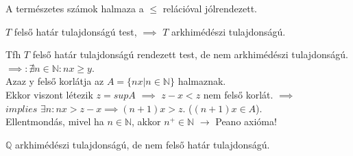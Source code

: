 \begin{frame}

\begin{tcolorbox}[title={Tétel: N rendezése}]
A természetes számok halmaza a $\leq$ relációval jólrendezett.
\end{tcolorbox}

\end{frame}

\begin{frame}

\begin{tcolorbox}[title={Tétel: Felső határ és arkhimédészi tulajdonság}]
$T$ felső határ tulajdonságú test, $\implies$ $T$ arkhimédészi tulajdonságú.
\end{tcolorbox}

\begin{tcolorbox}[title={Bizonyítás (Indirekt)}]
Tfh $T$ felső határ tulajdonságú rendezett test, de nem arkhimédészi tulajdonságú.\\
$\implies : {\nexists}n \in \mathbb{N} : nx \geq y$.\\
Azaz y felső korlátja az $A = \{ nx | n \in \mathbb{N} \}$ halmaznak.\\
Ekkor viszont létezik $z = sup A$ $\implies$ $z - x < z$ nem felső korlát. $\implies$\\
$implies$ ${\exists}n : nx > z - x \implies (n + 1)x > z$. ($(n + 1)x \in A$).\\
Ellentmondás, mivel ha $n \in \mathbb{N}$, akkor $n^+ \in \mathbb{N}$ $\rightarrow$ Peano axióma!
\end{tcolorbox}

\end{frame}

\begin{frame}

\begin{tcolorbox}[title={Tétel: Q nem felső határ tulajdonságú}]
$\mathbb{Q}$ arkhimédészi tulajdonságú, de nem felső határ tulajdonságú.
\end{tcolorbox}

\end{frame}


